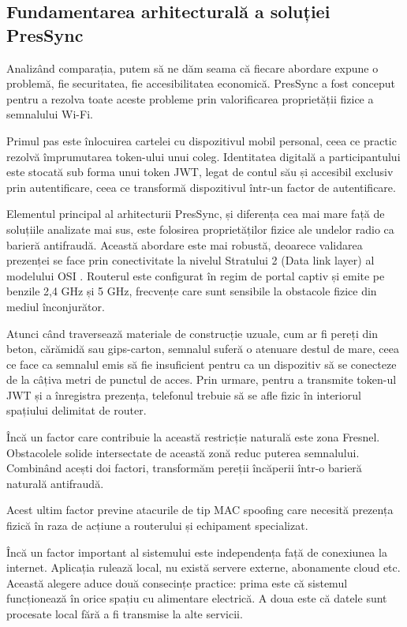 \documentclass[a4paper,12pt,oneside]{report}
\begin{document}
\subsection{Fundamentarea arhitecturală a soluției PresSync}
Analizând comparația, putem să ne dăm seama că fiecare abordare expune o problemă, fie securitatea, fie accesibilitatea economică. PresSync a fost conceput pentru a rezolva toate aceste probleme prin valorificarea proprietății fizice a semnalului Wi-Fi.

Primul pas este înlocuirea cartelei cu dispozitivul mobil personal, ceea ce practic rezolvă împrumutarea token-ului unui coleg. Identitatea digitală a participantului este stocată sub forma unui token JWT, legat de contul său și accesibil exclusiv prin autentificare, ceea ce transformă dispozitivul într-un factor de autentificare.

Elementul principal al arhitecturii PresSync, și diferența cea mai mare față de soluțiile analizate mai sus, este folosirea proprietăților fizice ale undelor radio ca barieră antifraudă. Această abordare este mai robustă, deoarece validarea prezenței se face prin conectivitate la nivelul Stratului 2 (Data link layer) al modelului OSI \cite{tanenbaum04}. Routerul este configurat în regim de portal captiv și emite pe benzile 2,4 GHz și 5 GHz, frecvențe care sunt sensibile la obstacole fizice din mediul înconjurător.

Atunci când traversează materiale de construcție uzuale, cum ar fi pereți din beton, cărămidă sau gips-carton, semnalul suferă o atenuare destul de mare, ceea ce face ca semnalul emis să fie insuficient pentru ca un dispozitiv să se conecteze de la câțiva metri de punctul de acces. Prin urmare, pentru a transmite token-ul JWT și a înregistra prezența, telefonul trebuie să se afle fizic în interiorul spațiului delimitat de router.

Încă un factor care contribuie la această restricție naturală este zona Fresnel. Obstacolele solide intersectate de această zonă reduc puterea semnalului. Combinând acești doi factori, transformăm pereții încăperii într-o barieră naturală antifraudă.

Acest ultim factor previne atacurile de tip MAC spoofing care necesită prezența fizică în raza de acțiune a routerului și echipament specializat.

Încă un factor important al sistemului este independența față de conexiunea la internet. Aplicația rulează local, nu există servere externe, abonamente cloud etc.
Această alegere aduce două consecințe practice: prima este că sistemul funcționează în orice spațiu cu alimentare electrică. A doua este că datele sunt procesate local fără a fi transmise la alte servicii.
\end{document}
